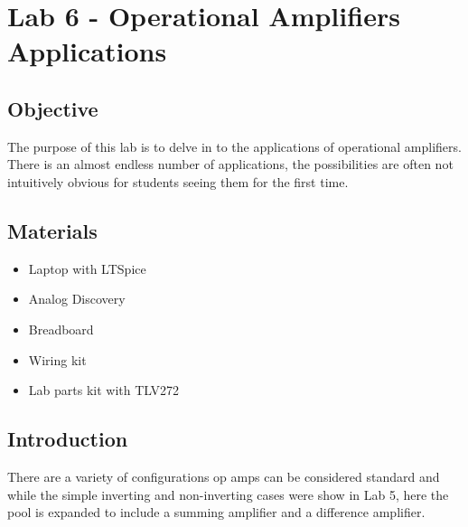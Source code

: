 \chapter{Lab 6 - Operational Amplifiers Applications}

\section{Objective}

The purpose of this lab is to delve in to the applications of operational amplifiers. There is an almost endless number of applications, the possibilities are often not intuitively obvious for students seeing them for the first time. 

\section{Materials}

\begin{itemize}
	\item Laptop with LTSpice
	\item Analog Discovery
	\item Breadboard
	\item Wiring kit
	\item Lab parts kit with TLV272 
\end{itemize}

\section{Introduction}

There are a variety of configurations op amps can be considered standard and while the simple inverting and non-inverting cases were show in Lab 5, here the pool is expanded to include a summing amplifier and a difference amplifier.

